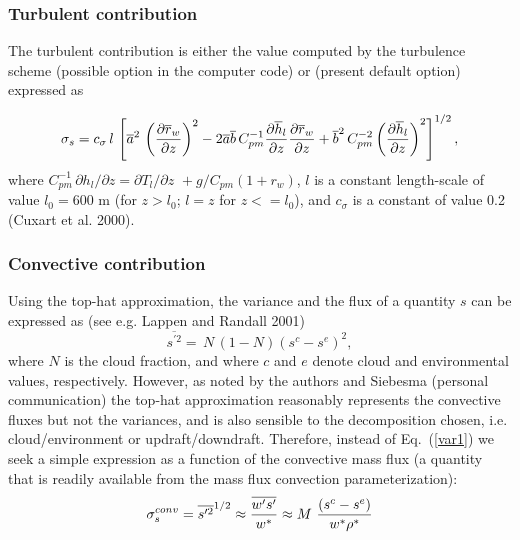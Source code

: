 \subsubsection{Turbulent contribution}

The turbulent contribution is either the value computed by the turbulence scheme
(possible option in the computer code) or (present default option) expressed as

\begin{equation}
\sigma_s  = c_\sigma\,l\, \left[
\overline{a}^2\,\left({\partial\overline{r}_w\over\partial z}\right)^2
-  2\overline{a}\overline{b}\, C_{pm}^{-1}
{\partial\overline{h}_l\over\partial z}
{\partial\overline{r}_w\over\partial z}
 + \overline{b}^2 \, C_{pm}^{-2}
\left({\partial\overline{h}_l\over\partial z}\right)^2\right]^{1/2},
\label{eqsp}
\end{equation}
\noindent
where $C_{pm}^{-1}\,\partial h_l/\partial z=\partial T_l/\partial z\,\,+g/C_{pm} (1+r_w)$, 
$l$ is a constant length-scale of value $l_0=600$ m  (for $z>l_0$; $l=z$ for $z<=l_0$), and
$c_\sigma$ is a constant of value 0.2 (Cuxart et al. 2000).

\subsubsection{Convective contribution}

Using the top-hat approximation, the variance and the flux of a quantity $s$ can be
expressed as (see e.g. Lappen and Randall  2001)
\begin{equation}
\overline{s^{\prime 2}}=\,N\,(1-N) (s^c -s^e)^2\label{var1},
\end{equation}
\noindent where $N$ is the cloud fraction,  and
where $c$ and $e$ denote cloud and environmental values, respectively. 
However, as noted by the authors and Siebesma (personal communication) the top-hat
approximation reasonably represents  the convective fluxes but not the variances, and is also sensible
to the decomposition chosen, i.e. cloud/environment or updraft/downdraft.
Therefore, instead of Eq.~(\ref{var1}) we seek a simple expression as a function of
the convective mass flux (a quantity that is readily available from the mass flux convection
parameterization):
\begin{equation}
\sigma_s^{conv}=\overline{s^{\prime 2}}^{1/2}\approx {\overline{w^\prime s^\prime }\over w^*}
\approx M\,\,{(s^c -s^e)\over w^* \rho^*}\label{var2}
\end{equation}

